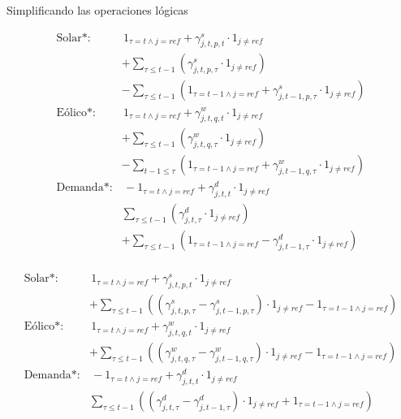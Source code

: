 Simplificando las operaciones lógicas

\begin{align*}
    \text{Solar*:} & \, 1_{\tau = t \wedge j = ref} + \gamma^{s}_{j, t, p, t}\cdot 1_{j\neq{ref}} \\
    & + \sum_{\tau \leqslant  t-1} \left ( \gamma^{s}_{j, t, p, \tau}\cdot 1_{j\neq{ref}} \right ) \\
    & - \sum_{\tau \leqslant  t-1} \left ( 1_{\tau = t-1 \wedge j = ref} + \gamma^{s}_{j, t-1, p, \tau}\cdot 1_{j\neq{ref}} \right ) \\
    \text{Eólico*:} & \, 1_{\tau = t \wedge j = ref} + \gamma^{w}_{j, t, q, t}\cdot 1_{j\neq{ref}} \\
    & + \sum_{\tau \leqslant  t-1} \left ( \gamma^{w}_{j, t, q, \tau}\cdot 1_{j\neq{ref}} \right ) \\
    & - \sum_{t-1 \leqslant \tau} \left ( 1_{\tau = t-1 \wedge j = ref} + \gamma^{w}_{j, t-1, q, \tau}\cdot 1_{j\neq{ref}} \right )  \\
    \text{Demanda*:} & \, - 1_{\tau = t \wedge j = ref} + \gamma^{d}_{j, t,t}\cdot 1_{j\neq{ref}} \\
    & \sum_{\tau \leqslant  t-1} \left ( \gamma^{d}_{j, t,\tau}\cdot 1_{j\neq{ref}} \right ) \\
    & + \sum_{\tau \leqslant  t-1} \left ( 1_{\tau = t-1 \wedge j = ref} - \gamma^{d}_{j, t-1,\tau}\cdot 1_{j\neq{ref}} \right )  \\
\end{align*}

\begin{align*}
    \text{Solar*:} & \, 1_{\tau = t \wedge j = ref} + \gamma^{s}_{j, t, p, t}\cdot 1_{j\neq{ref}} \\
    & + \sum_{\tau \leqslant  t-1} \left ( \left ( \gamma^{s}_{j, t, p, \tau} - \gamma^{s}_{j, t-1, p, \tau} \right ) \cdot 1_{j\neq{ref}} - 1_{\tau = t-1 \wedge j = ref} \right ) \\
    \text{Eólico*:} & \, 1_{\tau = t \wedge j = ref} + \gamma^{w}_{j, t, q, t}\cdot 1_{j\neq{ref}} \\
    & + \sum_{\tau \leqslant  t-1} \left ( \left ( \gamma^{w}_{j, t, q, \tau} - \gamma^{w}_{j, t-1, q, \tau} \right ) \cdot 1_{j\neq{ref}} - 1_{\tau = t-1 \wedge j = ref} \right )  \\
    \text{Demanda*:} & \, - 1_{\tau = t \wedge j = ref} + \gamma^{d}_{j, t,t}\cdot 1_{j\neq{ref}} \\
    & \sum_{\tau \leqslant  t-1} \left ( \left ( \gamma^{d}_{j, t,\tau} - \gamma^{d}_{j, t-1,\tau} \right ) \cdot 1_{j\neq{ref}} + 1_{\tau = t-1 \wedge j = ref} \right )  \\
\end{align*}

